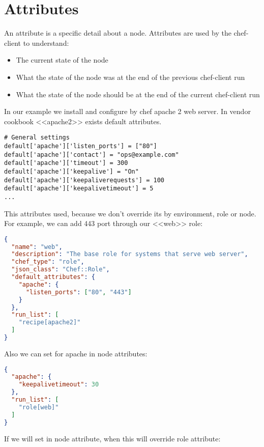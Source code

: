 \section{Attributes}
\label{sec:solo-attributes}

An attribute is a specific detail about a node. Attributes are used by the chef-client to understand:

\begin{itemize}
  \item The current state of the node
  \item What the state of the node was at the end of the previous chef-client run
  \item What the state of the node should be at the end of the current chef-client run
\end{itemize}

In our example we install and configure by chef apache 2 web server. In vendor cookbook <<apache2>> exists default attributes.

\begin{lstlisting}[label=lst:my-cloud-attributes1]
# General settings
default['apache']['listen_ports'] = ["80"]
default['apache']['contact'] = "ops@example.com"
default['apache']['timeout'] = 300
default['apache']['keepalive'] = "On"
default['apache']['keepaliverequests'] = 100
default['apache']['keepalivetimeout'] = 5
...
\end{lstlisting}

This attributes used, because we don't override its by environment, role or node. For example, we can add 443 port through our <<web>> role:

\begin{lstlisting}[language=JSON,label=lst:my-cloud-attributes2]
{
  "name": "web",
  "description": "The base role for systems that serve web server",
  "chef_type": "role",
  "json_class": "Chef::Role",
  "default_attributes": {
    "apache": {
      "listen_ports": ["80", "443"]
    }
  },
  "run_list": [
    "recipe[apache2]"
  ]
}
\end{lstlisting}

Also we can set  for apache in node attributes:

\begin{lstlisting}[language=JSON,label=lst:my-cloud-attributes3]
{
  "apache": {
    "keepalivetimeout": 30
  },
  "run_list": [
    "role[web]"
  ]
}
\end{lstlisting}

If we will set  in node attribute, when this will override role  attribute:

